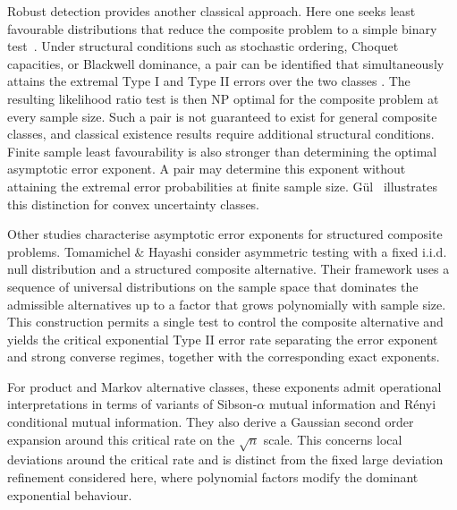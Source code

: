 \documentclass[journal,10pt,draftclsnofoot,onecolumn]{IEEEtran}
\begin{document}
Robust detection provides another classical approach. Here one seeks least favourable distributions that reduce the composite problem to a simple binary test~\cite{fauss2021minimax}. Under structural conditions such as stochastic ordering, Choquet capacities, or Blackwell dominance, a pair can be identified that simultaneously attains the extremal Type I and Type II errors over the two classes \cite{huber1965robust,verdu2003minimax,fauss2021minimax}. The resulting likelihood ratio test is then NP optimal for the composite problem at every sample size. Such a pair is not guaranteed to exist for general composite classes, and classical existence results require additional structural conditions. Finite sample least favourability is also stronger than determining the optimal asymptotic error exponent. A pair may determine this exponent without attaining the extremal error probabilities at finite sample size. G\"ul~\cite{gul2026structural} illustrates this distinction for convex uncertainty classes.

Other studies characterise asymptotic error exponents for structured composite problems. Tomamichel $\&$ Hayashi \cite{tomamichel2017operational} consider asymmetric testing with a fixed i.i.d. null distribution and a structured composite alternative. Their framework uses a sequence of universal distributions on the sample space that dominates the admissible alternatives up to a factor that grows polynomially with sample size. This construction permits a single test to control the composite alternative and yields the critical exponential Type II error rate separating the error exponent and strong converse regimes, together with the corresponding exact exponents.  




For product and Markov alternative classes, these exponents admit operational interpretations in terms of variants of Sibson-$\alpha$ mutual information and R\'enyi conditional mutual information. They also derive a Gaussian second order expansion around this critical rate on the $\sqrt n$ scale. This concerns local deviations around the critical rate and is distinct from the fixed large deviation refinement considered here, where polynomial factors modify the dominant exponential behaviour.
\end{document}

